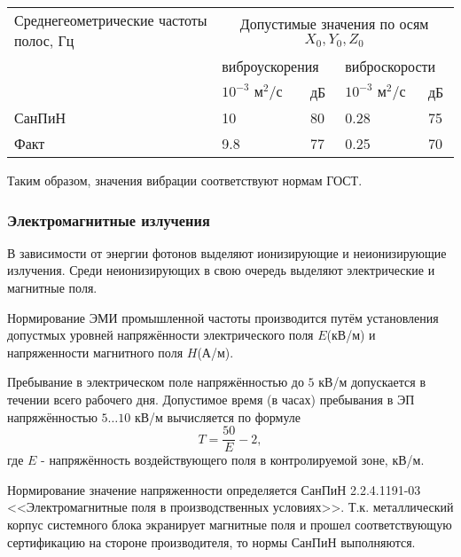 \begin{table}[H]
\begin{center}
\begin{tabular}{|p{4.1cm}|p{2cm}|p{1cm}|p{2cm}|p{1cm}|}
\hline
Среднегеометрические частоты полос, Гц & \multicolumn{4}{|c|}{Допустимые значения по осям $X_0, Y_0, Z_0$  } \\
\cline{2-5}
       & \multicolumn{2}{|l|}{виброускорения                   }&\multicolumn{2}{|l|}{ виброскорости                    } \\
\cline{2-5}
       & $10^{-3} \mbox{ м}^2 / \mbox{с}$  & дБ & $10^{-3} \mbox{ м}^2 / \mbox{с}$  & дБ   \\
\hline
СанПиН & 10                                & 80 & 0.28                              & 75   \\
\hline
Факт   & 9.8                               & 77 & 0.25                              & 70   \\
\hline
\end{tabular}
\end{center}
\end{table}

Таким образом, значения вибрации соответствуют нормам ГОСТ.

\subsubsection{Электромагнитные излучения}

В зависимости от энергии фотонов выделяют ионизирующие и неиони\-зирующие излу\-чения. Среди неионизирующих в свою очередь выделяют элек\-трические и магнитные поля.

Нормирование ЭМИ промышленной частоты производится путём уста\-новления допус\-тмых уровней напряжённости электрического поля $E$(кВ/м) и напряженности маг\-нитного поля $H$(А/м).

Пребывание в электрическом поле напряжённостью до $5$ кВ/м допускается в течении всего рабочего дня. Допустимое время (в часах) пребывания в ЭП напряжённостью $5 \ldots 10$ кВ/м вычисляется по формуле
$$
T = \frac{50}{E} - 2,
$$
где $E$ - напряжённость воздействующего поля в контролируемой зоне, кВ/м.

Нормирование значение напряженности определяется СанПиН 2.2.4.1191-03 <<Электро\-магнитные поля в производственных условиях>>. Т.к. металличес\-кий корпус системного блока экранирует магнитные поля и прошел соответ\-ствующую сертификацию на стороне производителя, то нормы СанПиН вы\-полняются.

